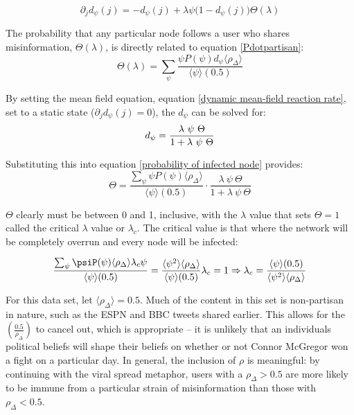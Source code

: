 \documentclass[NETN,manuscript]{stjour-new}
\begin{document}
\begin{equation}
\label{dynamic mean-field reaction rate}
    \partial_jd_{\psi}(j) = - d_{\psi}(j) + \lambda \psi \big(1 - d_{\psi}(j)\big)\Theta(\lambda)
\end{equation}

The probability that any particular node follows a user who shares misinformation, $\Theta(\lambda)$, is directly related to equation \ref{Pdotpartisan}:
\begin{equation}
\label{probability of infected node}
    \Theta(\lambda) = \sum_{\psi} \frac{\psi P(\psi)d_{\psi}\langle\rho_{\Delta}\rangle}{\langle \psi \rangle (0.5)}
\end{equation}

By setting the mean field equation, equation \ref{dynamic mean-field reaction rate}, set to a static state ($\partial_jd_{\psi}(j) = 0$), the $d_{\psi}$ can be solved for:
\begin{equation}
\label{static d_{\psi}}
    d_{\psi} = \frac{\lambda \ \psi \ \Theta}{1 + \lambda \ \psi \ \Theta}
\end{equation}

Substituting this into equation \ref{probability of infected node} provides:
\begin{equation}
    \Theta =  \frac{\sum_{\psi} \psi P(\psi)\langle\rho_{\Delta}\rangle}{\langle \psi \rangle(0.5)}\cdot \frac{\lambda \ \psi \ \Theta}{1 + \lambda \ \psi \ \Theta}
\end{equation}

$\Theta$ clearly must be between 0 and 1, inclusive, with the $\lambda$ value that sets $\Theta = 1$ called the critical $\lambda$ value or $\lambda_c$. The critical value is that where the network will be completely overrun and every node will be infected: 

\begin{equation}
\label{critical value equation}
    \frac{\sum_{\psi} \psiP(\psi)\langle\rho_{\Delta}\rangle\lambda_c\psi}{\langle \psi \rangle(0.5)} = \frac{\langle \psi^2 \rangle\langle\rho_{\Delta}\rangle}{\langle \psi \rangle(0.5)}\lambda_c = 1 \Rightarrow \lambda_c = \frac{\langle \psi \rangle(0.5)}{\langle \psi^2 \rangle\langle\rho_{\Delta}\rangle}
\end{equation}

For this data set, let $\langle \rho_{\Delta} \rangle = 0.5$. Much of the content in this set is non-partisan in nature, such as the ESPN and BBC tweets shared earlier. This allows for the $\left(\frac{0.5}{\rho_{\Delta}}\right)$ to cancel out, which is appropriate -- it is unlikely that an individuals political beliefs will shape their beliefs on whether or not Connor McGregor won a fight on a particular day. In general, the inclusion of $\rho$ is meaningful: by continuing with the viral spread metaphor, users with a $\rho_{\Delta} > 0.5$ are more likely to be immune from a particular strain of misinformation than those with  $\rho_{\Delta} < 0.5$.
\end{document}
